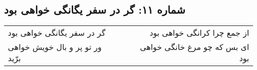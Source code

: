 \begin{center}
\section*{شماره ۱۱: گر در سفر یگانگی خواهی بود}
\label{sec:011}
\begin{longtable}{l p{0.5cm} r}
گر در سفر یگانگی خواهی بود
&&
از جمع چرا کرانگی خواهی بود
\\
ور تو پر و بال خویش خواهی برّید
&&
ای بس که چو مرغ خانگی خواهی بود
\\
\end{longtable}
\end{center}
